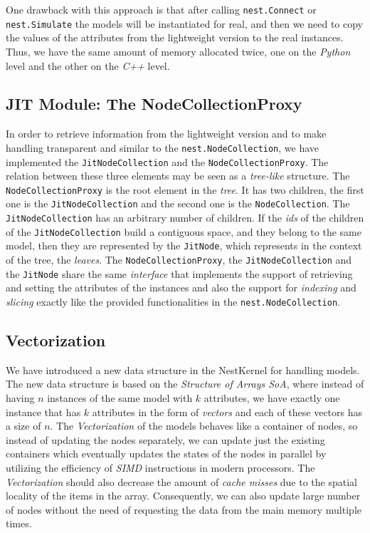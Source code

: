 One drawback with this approach is that after calling \texttt{nest.Connect} or \texttt{nest.Simulate} the models will be instantiated for real, and then we need to copy the values of the attributes from the lightweight version to the real instances. Thus, we have the same amount of memory allocated twice, one on the \emph{Python} level and the other on the \emph{C++} level.

\subsection*{JIT Module: The NodeCollectionProxy}

In order to retrieve information from the lightweight version and to make handling transparent and similar to the \texttt{nest.NodeCollection}, we have implemented the \texttt{JitNodeCollection} and the \texttt{NodeCollectionProxy}. The relation between these three elements may be seen as a \emph{tree-like} structure. The \texttt{NodeCollectionProxy} is the root element in the \emph{tree}. It has two children, the first one is the \texttt{JitNodeCollection} and the second one is the \texttt{NodeCollection}. The \texttt{JitNodeCollection} has an arbitrary number of children. If the \emph{ids} of the children of the \texttt{JitNodeCollection} build a contiguous space, and they belong to the same model, then they are represented by the \texttt{JitNode}, which represents in the context of the tree, the \emph{leaves}. The \texttt{NodeCollectionProxy}, the \texttt{JitNodeCollection} and the \texttt{JitNode} share the same \emph{interface} that implements the support of retrieving and setting the attributes of the instances and also the support for \emph{indexing} and \emph{slicing} exactly like the provided functionalities in the \texttt{nest.NodeCollection}.

\subsection*{Vectorization}

We have introduced a new data structure in the NestKernel for handling models. The new data structure is based on the \emph{Structure of Arrays SoA}, where instead of having $n$ instances of the same model with $k$ attributes, we have exactly one instance that has $k$ attributes in the form of \emph{vectors} and each of these vectors has a size of $n$. The \emph{Vectorization} of the models behaves like a container of nodes, so instead of updating the nodes separately, we can update just the existing containers which eventually updates the states of the nodes in parallel by utilizing the efficiency of \emph{SIMD} instructions in modern processors. The \emph{Vectorization} should also decrease the amount of \emph{cache misses} due to the spatial locality of the items in the array. Consequently, we can also update large number of nodes without the need of requesting the data from the main memory multiple times.


